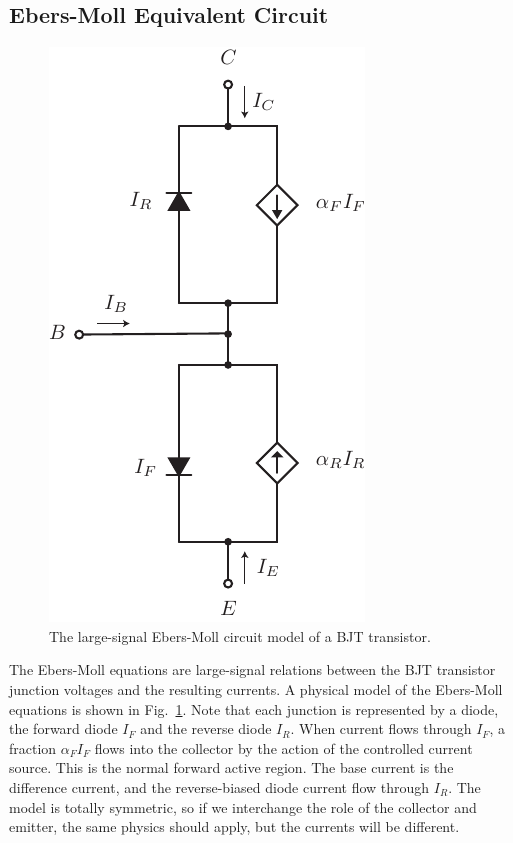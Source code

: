 \subsection{Ebers-Moll Equivalent Circuit}
\begin{figure}[tb]
\centering
\includegraphics[scale=.7]{slide17_ebers_moll}
\caption{The large-signal Ebers-Moll circuit model of a BJT transistor.}
\label{fig:slide17_ebers_moll}
\end{figure}
The Ebers-Moll equations are large-signal relations between the BJT transistor junction voltages and the resulting currents.  A physical model of the Ebers-Moll equations is shown in Fig.~\ref{fig:slide17_ebers_moll}.  Note that each junction is represented by a diode, the forward diode $I_F$ and the reverse diode $I_R$.  When current flows through $I_F$, a fraction $\alpha_F I_F$ flows into the collector by the action of the controlled current source.  This is the normal forward active region. The base current is the difference current, and the reverse-biased diode current flow through $I_R$.  The model is totally symmetric, so if we interchange the role of the collector and emitter, the same physics should apply, but the currents will be different.  
